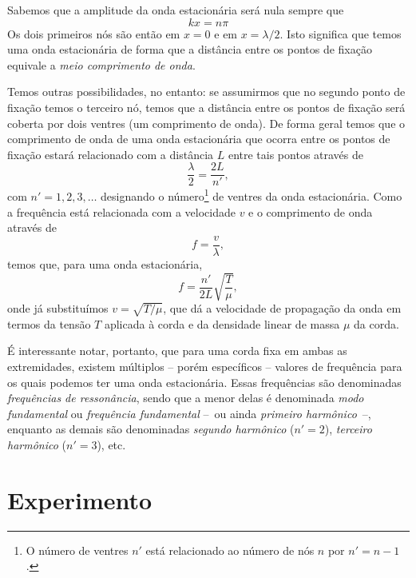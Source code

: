 Sabemos que a amplitude da onda estacionária será nula sempre que
\begin{equation}
	kx = n\pi
\end{equation}
Os dois primeiros nós são então em $x=0$ e em $x = \lambda/2$. Isto significa que temos uma onda estacionária de forma que a distância entre os pontos de fixação equivale a \emph{meio comprimento de onda}.

Temos outras possibilidades, no entanto: se assumirmos que no segundo ponto de fixação temos o terceiro nó, temos que a distância entre os pontos de fixação será coberta por dois ventres (um comprimento de onda). De forma geral temos que o comprimento de onda de uma onda estacionária que ocorra entre os pontos de fixação estará relacionado com a distância $L$ entre tais pontos através de
\begin{equation}
	\frac{\lambda}{2} = \frac{2L}{n'},
\end{equation}
com $n' = 1, 2, 3, \dots$ designando o número\footnote{O número de ventres $n'$ está relacionado ao número de nós $n$ por $n'=n-1$.} de ventres da onda estacionária. Como a frequência está relacionada com a velocidade $v$ e o comprimento de onda através de
\begin{equation}
	f = \frac{v}{\lambda},
\end{equation}
%
temos que, para uma onda estacionária,
\begin{equation}\label{Eq:RelacaoVariaveisOndasEstacionarias}
	f = \frac{n'}{2L}\sqrt{\frac{T}{\mu}},
\end{equation}
onde já substituímos $v = \sqrt{T/\mu}$, que dá a velocidade de propagação da onda em termos da tensão $T$ aplicada à corda e da densidade linear de massa $\mu$ da corda.

É interessante notar, portanto, que para uma corda fixa em ambas as extremidades, existem múltiplos -- porém específicos -- valores de frequência para os quais podemos ter uma onda estacionária. Essas frequências são denominadas \emph{frequências de ressonância}, sendo que a menor delas é denominada \emph{modo fundamental} ou \emph{frequência fundamental} --~ou ainda \emph{primeiro harmônico}~--, enquanto as demais são denominadas \emph{segundo harmônico} ($n'=2$), \emph{terceiro harmônico} ($n'=3$), etc.

\section{Experimento}

